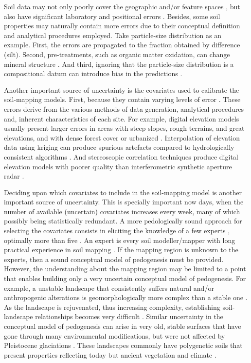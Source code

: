 Soil data may not only poorly cover the geographic and/or feature spaces \cite{HenglEtAl2003a}, but
also have significant laboratory and positional errors \cite{NelsonEtAl2011}. Besides, some soil 
properties may naturally contain more errors due to their conceptual definition and analytical 
procedures employed. Take particle-size distribution as an example. First, the errors are propagated
to the fraction obtained by difference (silt). Second, pre-treatments, such as organic matter 
oxidation, can change mineral structure \cite{MikuttaEtAl2005a}. And third, ignoring that the 
particle-size distribution is a compositional datum can introduce bias in the predictions 
\cite{LarkEtAl2007}.

Another important source of uncertainty is the covariates used to calibrate the soil-mapping models.
First, because they contain varying levels of error \cite{HeuvelinkEtAl1989}. These errors derive 
from the various methods of data generation, analytical procedures and, inherent characteristics of 
each site. For example, digital elevation models usually present larger errors in areas with steep 
slopes, rough terrains, and great elevations, and with dense forest cover or urbanized 
\cite{Florinsky1998,Toutin2000,FisherEtAl2006}. Interpolation of elevation data using kriging 
can produce spurious artefacts \cite{HenglEtAl2009} compared to hydrologically consistent 
algorithms \cite{Hutchinson1989}. And stereoscopic correlation techniques produce digital elevation
models with poorer quality than interferometric synthetic aperture radar \cite{HirtEtAl2010}.

Deciding upon which covariates to include in the soil-mapping model is another important source of 
uncertainty. This is specially important now days, when the number of available (uncertain) 
covariates increases every week, many of which possibly being statistically redundant. A more
pedologically sound approach for selecting the covariates consists in eliciting the knowledge of a 
few experts \cite{LarkEtAl2007a}, optimally more than five \cite{MeyerEtAl2001}. An expert is 
every soil modeller/mapper with long practical experience in soil mapping \cite{MeyerEtAl2001}. 
If the mapping region is unknown to the experts, then a sound conceptual model of pedogenesis must be
provided. However, the understanding about the mapping region may be limited to a point that enables
building only a very uncertain conceptual model of pedogenesis. For example, a unstable landscape that
consistently suffers natural and/or anthropogenic alterations is geomorphologically more complex than 
a stable one \cite{Schumm1979}. As the landscape is rejuvenated, thus increasing complexity, establishing 
soil-landscape relationships becomes very difficult \cite{StreckEtAl2008}. Similar uncertainty 
in the conceptual model of pedogenesis can arise in very old, stable surfaces that have gone 
through many environmental modifications, but were not affected by Pleistocene glaciations 
\cite{MckenzieEtAl2006}. These landscapes commonly have polygenetic soils that present properties
reflecting today but ancient vegetation and climate \cite{PainEtAl1995,Ker1998}.

